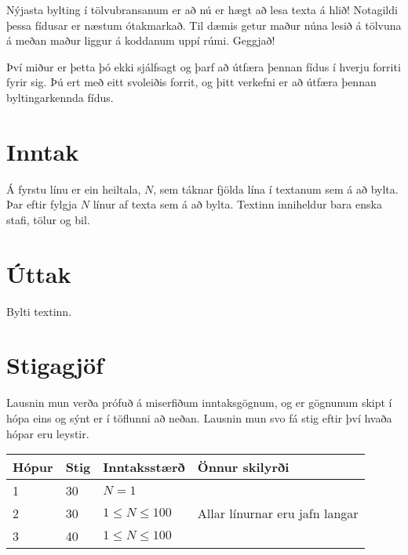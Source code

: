 
Nýjasta bylting í tölvubransanum er að nú er hægt að lesa texta á hlið!
Notagildi þessa fídusar er næstum ótakmarkað. Til dæmis getur maður núna lesið
á tölvuna á meðan maður liggur á koddanum uppí rúmi. Geggjað!

Því miður er þetta þó ekki sjálfsagt og þarf að útfæra þennan fídus í hverju
forriti fyrir sig. Þú ert með eitt svoleiðis forrit, og þitt verkefni er að
útfæra þennan byltingarkennda fídus.

\section*{Inntak}
Á fyrstu línu er ein heiltala, $N$, sem táknar fjölda lína í textanum sem á að
bylta. Þar eftir fylgja $N$ línur af texta sem á að bylta. Textinn inniheldur
bara enska stafi, tölur og bil.

\section*{Úttak}
Bylti textinn.

\section*{Stigagjöf}
Lausnin mun verða prófuð á miserfiðum inntaksgögnum, og er gögnunum skipt í
hópa eins og sýnt er í töflunni að neðan. Lausnin mun svo fá stig eftir því
hvaða hópar eru leystir.

\begin{tabular}{|l|l|l|l|}
\hline
Hópur & Stig & Inntaksstærð & Önnur skilyrði \\ \hline
1     & 30   & $N=1$ & \\ \hline
2     & 30   & $1\leq N \leq 100$ & Allar línurnar eru jafn langar \\ \hline
3     & 40   & $1\leq N \leq 100$ & \\ \hline
\end{tabular}
